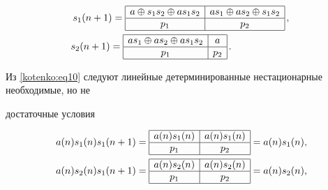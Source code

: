 \begin{gather}

\label{kotenko:eq10}

s_1 (n+1)=\begin{array}{|c|c|} \hline

a\oplus s_1 s_2 \oplus as_1 s_2 & as_1 \oplus as_2 \oplus s_1 s_2  \\ \hline

p_1  & p_2  \\ \hline

\end{array}\, ,\\

\label{kotenko:eq11}

s_2 (n+1)=\begin{array}{|c|c|}\hline

as_1 \oplus as_2 \oplus as_1 s_2 & a  \\ \hline

p_1 & p_2 \\ \hline

\end{array}\,. \hspace{2.15cm}

\end{gather}



Из \eqref{kotenko:eq10} следуют линейные детерминированные нестационарные необходимые, но не

достаточные условия

\begin{gather*}

a ( n )s_1  ( n )s_1 (n+1)=\begin{array}{|c|c|} \hline

a ( n )s_1  ( n ) & a ( n  )s_1  ( n  ) \\ \hline

p_1 & p_2 \\ \hline

\end{array}=a (n)s_1(n),\\

a ( n )s_2  ( n )s_1  (n+1)=\begin{array}{|c|c|} \hline

a ( n )s_2  ( n ) & a ( n )s_2  ( n  ) \\ \hline

p_1  & p_2  \\ \hline

\end{array} =a ( n  )s_2  ( n ),

\end{gather*}

